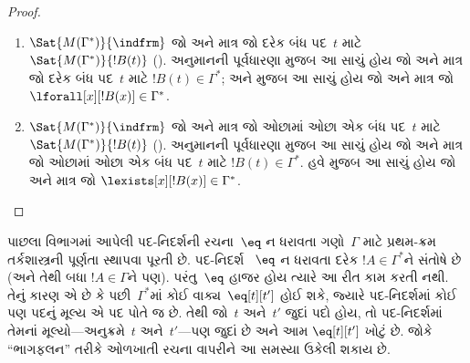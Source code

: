 \begin{proof}
\begin{enumerate}
%
\item %
      {$\Sat{M(\Gamma^*)}{\indfrm}$ જો અને માત્ર જો દરેક બંધ પદ~$t$
      માટે $\Sat{M(\Gamma^*)}{!B(t)}$
      (). અનુમાનની પૂર્વધારણા મુજબ આ સાચું
      હોય જો અને માત્ર જો દરેક બંધ પદ~$t$ માટે $!B(t)\in\Gamma^*$;
      અને  મુજબ આ સાચું હોય જો અને
      માત્ર જો $\lforall[x][!B(x)]\in\Gamma^*$.}

\item %
      {$\Sat{M(\Gamma^*)}{\indfrm}$ જો અને માત્ર જો ઓછામાં ઓછા એક બંધ
      પદ~$t$ માટે $\Sat{M(\Gamma^*)}{!B(t)}$
      (). અનુમાનની પૂર્વધારણા મુજબ આ સાચું
      હોય જો અને માત્ર જો ઓછામાં ઓછા એક બંધ પદ~$t$ માટે
      $!B(t)\in\Gamma^*$. હવે 
      મુજબ આ સાચું હોય જો અને માત્ર જો
      $\lexists[x][!B(x)]\in\Gamma^*$.}

\end{enumerate}
\end{proof}


\endgroup


%
  \begingroup
\makeatletter{}\makeatother

\label{guunit:OLP-0133}


\begin{explain}
પાછલા વિભાગમાં આપેલી પદ-નિદર્શની રચના~$\eq$ ન ધરાવતા ગણો~$\Gamma$
માટે પ્રથમ-ક્રમ તર્કશાસ્ત્રની પૂર્ણતા સ્થાપવા પૂરતી છે. પદ-નિદર્શ
~$\eq$ ન ધરાવતા દરેક $!A \in \Gamma^*$ને સંતોષે છે (અને તેથી બધા
$!A \in \Gamma$ને પણ). પરંતુ~$\eq$ હાજર હોય ત્યારે આ રીત કામ
કરતી નથી. તેનું કારણ એ છે કે પછી~$\Gamma^*$માં કોઈ
વાક્ય~$\eq[t][t']$ હોઈ શકે, જ્યારે પદ-નિદર્શમાં કોઈ પણ પદનું
મૂલ્ય એ પદ પોતે જ છે. તેથી જો~$t$ અને~$t'$ જુદાં પદો હોય, તો
પદ-નિદર્શમાં તેમનાં મૂલ્યો—અનુક્રમે~$t$ અને~$t'$—પણ જુદાં છે અને આમ
$\eq[t][t']$ ખોટું છે. જોકે ``ભાગફલન'' તરીકે ઓળખાતી રચના વાપરીને આ
સમસ્યા ઉકેલી શકાય છે.
\end{explain}

